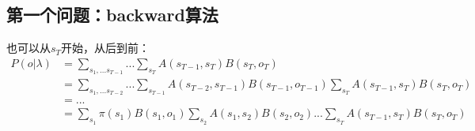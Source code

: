 \documentclass[11pt,a4paper]{article}
\numberwithin{equation}{section}
\begin{document}
\subsection{第一个问题：backward算法}
也可以从$s_T$开始，从后到前：
\begin{equation}\begin{split}
P(o | \lambda)
& = \sum_{s_1, ... s_{T - 1}} ... \sum_{s_T} A(s_{T - 1}, s_T) B(s_T, o_T)\\
& = \sum_{s_1, ... s_{T - 2}} ... \sum_{s_{T - 1}} A(s_{T - 2}, s_{T - 1}) B(s_{T - 1}, o_{T - 1}) \sum_{s_T} A(s_{T - 1}, s_T) B(s_T, o_T)\\
& = ...\\
& = \sum_{s_1} \pi(s_1) B(s_1, o_1) \sum_{s_2} A(s_1, s_2) B(s_2, o_2) ... \sum_{s_T} A(s_{T - 1}, s_T) B(s_T, o_T)
\end{split}\end{equation}
\end{document}
